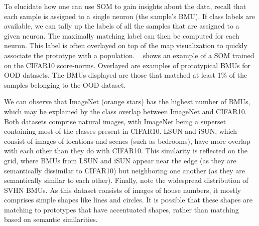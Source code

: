 To elucidate how one can use SOM to gain insights about the data, recall that each sample is assigned to a single neuron (the sample's BMU). If class labels are available, we can tally up the labels of all the samples that are assigned to a given neuron. The maximally matching label can then be computed for each neuron. This label is often overlayed on top of the map visualization to quickly associate the prototype with a population. ~ shows an example of a SOM trained on the CIFAR10 score-norms. Overlayed are examples of prototypical BMUs for OOD datasets. The BMUs displayed are those that matched at least 1\% of the samples belonging to the OOD dataset.

We can observe that ImageNet (orange stars) has the highest number of BMUs, which may be explained by the class overlap between ImageNet and CIFAR10. Both datasets comprise natural images, with ImageNet being a superset containing most of the classes present in CIFAR10.
LSUN and iSUN, which consist of images of locations and scenes (such as bedrooms), have more overlap with each other than they do with CIFAR10. This similarity is reflected on the grid, where BMUs from LSUN and iSUN appear near the edge (as they are semantically dissimilar to CIFAR10) but neighboring one another (as they are semantically similar to each other).
Finally, note the widespread distribution of SVHN BMUs. As this dataset consists of images of house numbers, it mostly comprises simple shapes like lines and circles. It is possible that these shapes are matching to prototypes that have accentuated shapes, rather than matching based on semantic similarities.


